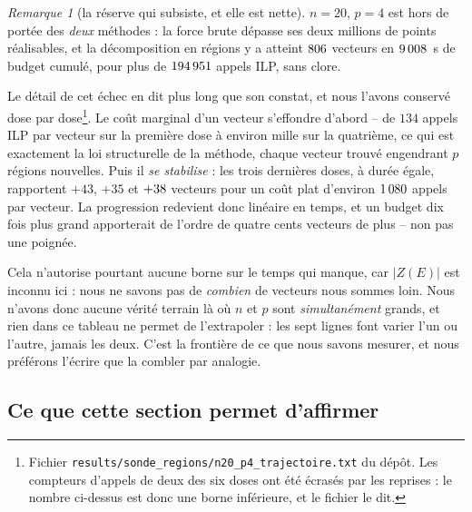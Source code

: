 \documentclass[11pt,a4paper]{article}
\theoremstyle{plain}
\theoremstyle{remark}
\newtheorem{remark}{Remarque}
\begin{document}
\begin{remark}[la réserve qui subsiste, et elle est nette]
$n=20$, $p=4$ est hors de portée des \emph{deux} méthodes : la force brute
dépasse ses deux millions de points réalisables, et la décomposition en
régions y a atteint $806{}$ vecteurs en $9\,008{}$~s de
budget cumulé, pour plus de $194\,951{}$ appels ILP, sans clore.

Le détail de cet échec en dit plus long que son constat, et nous l'avons
conservé dose par dose\footnote{Fichier
\texttt{results/sonde\_regions/n20\_p4\_trajectoire.txt} du dépôt. Les
compteurs d'appels de deux des six doses ont été écrasés par les reprises :
le nombre ci-dessus est donc une borne inférieure, et le fichier le dit.}.
Le coût marginal d'un vecteur s'effondre d'abord -- de $134$ appels ILP par
vecteur sur la première dose à environ mille sur la quatrième, ce qui est
exactement la loi structurelle de la méthode, chaque vecteur trouvé
engendrant $p$ régions nouvelles. Puis il \emph{se stabilise} : les trois
dernières doses, à durée égale, rapportent $+43$, $+35$ et
$+38{}$ vecteurs pour un coût plat d'environ
$1\,080{}$ appels par vecteur. La progression redevient donc
linéaire en temps, et un budget dix fois plus grand apporterait de l'ordre
de quatre cents vecteurs de plus -- non pas une poignée.

Cela n'autorise pourtant aucune borne sur le temps qui manque, car
$|Z(E)|$ est inconnu ici : nous ne savons pas de \emph{combien} de vecteurs
nous sommes loin. Nous n'avons donc aucune vérité terrain là où $n$ et $p$
sont \emph{simultanément} grands, et rien dans ce tableau ne permet de
l'extrapoler : les sept lignes font varier l'un ou l'autre, jamais les deux.
C'est la frontière de ce que nous savons mesurer, et nous préférons l'écrire
que la combler par analogie.
\end{remark}

\subsection{Ce que cette section permet d'affirmer}
\end{document}
